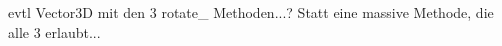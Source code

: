 

\missing[Sem5 VL6]



evtl Vector3D mit den 3 rotate\_ Methoden...?
Statt eine massive Methode, die alle 3 erlaubt...
